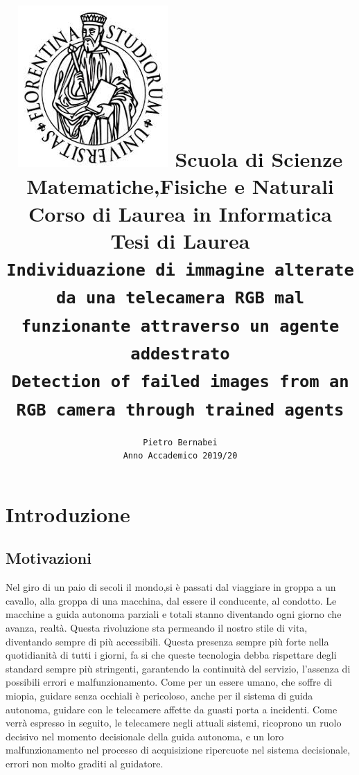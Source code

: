 \documentclass[14pt]{extarticle}
\begin{document}
\title{\includegraphics[scale=0.2]{download.jpeg} \vspace{2cm} Scuola di Scienze  Matematiche,Fisiche e Naturali \\ Corso di Laurea in Informatica \\Tesi di Laurea \\ \texttt{Individuazione di immagine alterate da una telecamera RGB mal funzionante attraverso un agente addestrato}\\ \texttt{Detection of failed images from an RGB camera through trained agents}}
\author{\texttt{Pietro Bernabei} \\ \texttt{Anno Accademico 2019/20}}
\date{}
\maketitle
\newpage
\tableofcontents

\newpage
\section{Introduzione}
\subsection{Motivazioni}
Nel giro di un paio di secoli il mondo,si  è passati dal viaggiare in groppa a un cavallo, alla groppa di una macchina, dal essere il conducente, al condotto. Le macchine a guida autonoma parziali e totali stanno diventando ogni giorno che avanza, realtà. Questa rivoluzione sta permeando il nostro stile di vita, diventando sempre di più accessibili.  Questa presenza sempre più forte nella quotidianità di tutti i giorni, fa si che queste tecnologia debba rispettare degli standard sempre più stringenti, garantendo la continuità del servizio, l'assenza di possibili errori e malfunzionamento.
Come per un essere umano, che soffre di miopia, guidare senza occhiali è pericoloso, anche per il sistema di guida autonoma, guidare con le telecamere affette da guasti porta a incidenti.
Come verrà espresso in seguito, le telecamere negli attuali sistemi, ricoprono un ruolo decisivo nel momento decisionale della guida autonoma, e un loro malfunzionamento nel processo di acquisizione ripercuote nel sistema decisionale, errori non molto graditi al guidatore.
\end{document}
